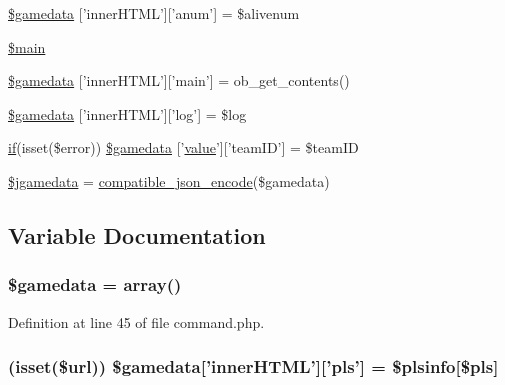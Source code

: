 \begin{DoxyCompactItemize}
$$\item 
\hyperlink{command_8php_abc840bb3aade3c2e5c654f8d16a93a01}{\$gamedata} \mbox{[}'inner\+H\+T\+M\+L'\mbox{]}\mbox{[}'anum'\mbox{]} = \$alivenum
\item 
\hyperlink{command_8php_a67a14860123d3f27f92196239b0a5b46}{\$main}
\item 
\hyperlink{command_8php_aea43421c223abcfe0f87eba2ed1a9c96}{\$gamedata} \mbox{[}'inner\+H\+T\+M\+L'\mbox{]}\mbox{[}'main'\mbox{]} = ob\+\_\+get\+\_\+contents()
\item 
\hyperlink{command_8php_ac0c8e341e5b5c1499ae39285ff039122}{\$gamedata} \mbox{[}'inner\+H\+T\+M\+L'\mbox{]}\mbox{[}'log'\mbox{]} = \$log
\item 
\hyperlink{login__old_8php_a4ac1118c2e44c513a674bc1793ba6c90}{if}(isset(\$error)) \hyperlink{command_8php_a3bb7e13ced7e0a1819da876e71142b64}{\$gamedata} \mbox{[}'\hyperlink{1__chat_8tpl_8php_afcc7a4b78ecd8fa7e713f8cfa0f51017}{value}'\mbox{]}\mbox{[}'team\+I\+D'\mbox{]} = \$team\+I\+D
\item 
\hyperlink{command_8php_ad8ad32ee4a34333c6c5c5b4379a80cf2}{\$jgamedata} = \hyperlink{global_8func_8php_a90ee856f9044b751e8c137763608fba4}{compatible\+\_\+json\+\_\+encode}(\$gamedata)
\end{DoxyCompactItemize}


\subsection{Variable Documentation}
\hypertarget{command_8php_a2c99f4f40b60cc6b3b312c14ee101085}{
\subsubsection[{\$gamedata}]{\setlength{\rightskip}{0pt plus 5cm}\$gamedata = array()}}\label{command_8php_a2c99f4f40b60cc6b3b312c14ee101085}


Definition at line 45 of file command.\+php.

\hypertarget{command_8php_ac9b663b3bbed4178f8fa8fec9a95a6af}{
\subsubsection[{\$gamedata}]{ (isset(\$url)) \$gamedata\mbox{[}'inner\+H\+T\+M\+L'\mbox{]}\mbox{[}'pls'\mbox{]} = \$plsinfo\mbox{[}\$pls\mbox{]}}}\label{command_8php_ac9b663b3bbed4178f8fa8fec9a95a6af}


